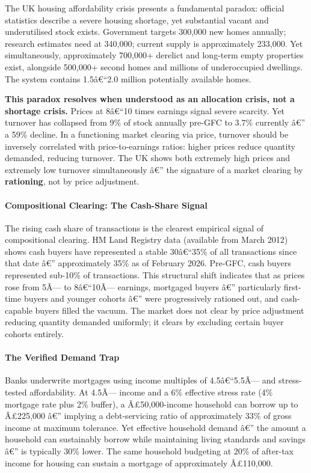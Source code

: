 The UK housing affordability crisis presents a fundamental paradox:
official statistics describe a severe housing shortage, yet substantial
vacant and underutilised stock exists. Government targets 300,000 new
homes annually; research estimates need at 340,000; current supply is
approximately 233,000. Yet simultaneously, approximately 700,000+
derelict and long-term empty properties exist, alongside 500,000+ second
homes and millions of underoccupied dwellings. The system contains
1.5â€``2.0 million potentially available homes.

\textbf{This paradox resolves when understood as an allocation crisis,
not a shortage crisis.} Prices at 8â€``10 times earnings signal severe
scarcity. Yet turnover has collapsed from 9\% of stock annually pre-GFC
to 3.7\% currently â€'' a 59\% decline. In a functioning market clearing
via price, turnover should be inversely correlated with
price-to-earnings ratios: higher prices reduce quantity demanded,
reducing turnover. The UK shows both extremely high prices and extremely
low turnover simultaneously â€'' the signature of a market clearing by
\textbf{rationing}, not by price adjustment.

\paragraph{Compositional Clearing: The Cash-Share
Signal}\label{compositional-clearing-the-cash-share-signal}

The rising cash share of transactions is the clearest empirical signal
of compositional clearing. HM Land Registry data (available from March
2012) shows cash buyers have represented a stable 30â€``35\% of all
transactions since that date â€'' approximately 35\% as of February
2026. Pre-GFC, cash buyers represented sub-10\% of transactions. This
structural shift indicates that as prices rose from 5Ã--- to 8â€``10Ã---
earnings, mortgaged buyers â€'' particularly first-time buyers and
younger cohorts â€'' were progressively rationed out, and cash-capable
buyers filled the vacuum. The market does not clear by price adjustment
reducing quantity demanded uniformly; it clears by excluding certain
buyer cohorts entirely.

\paragraph{The Verified Demand Trap}\label{the-verified-demand-trap}

Banks underwrite mortgages using income multiples of 4.5â€``5.5Ã--- and
stress-tested affordability. At 4.5Ã--- income and a 6\% effective
stress rate (4\% mortgage rate plus 2\% buffer), a Â£50,000-income
household can borrow up to Â£225,000 â€'' implying a debt-servicing
ratio of approximately 33\% of gross income at maximum tolerance. Yet
effective household demand â€'' the amount a household can sustainably
borrow while maintaining living standards and savings â€'' is typically
30\% lower. The same household budgeting at 20\% of after-tax income for
housing can sustain a mortgage of approximately Â£110,000.

